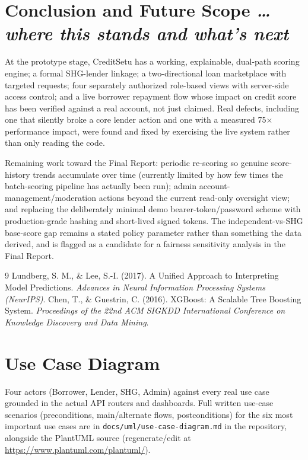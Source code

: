 \documentclass[11pt,a4paper]{article}
\newcommand{\BvrHint}[1]{%
  {\normalfont\normalsize\itshape\hfill #1}}
\begin{document}
\section{Conclusion and Future Scope%
\BvrHint{\ldots where this stands and what's next}}

At the prototype stage, CreditSetu has a working, explainable,
dual-path scoring engine; a formal SHG-lender linkage; a two-directional
loan marketplace with targeted requests; four separately authorized
role-based views with server-side access control; and a live borrower
repayment flow whose impact on credit score has been verified against
a real account, not just claimed. Real defects, including one that
silently broke a core lender action and one with a measured
75$\times$ performance impact, were found and fixed by exercising the
live system rather than only reading the code.

Remaining work toward the Final Report: periodic re-scoring so genuine
score-history trends accumulate over time (currently limited by how
few times the batch-scoring pipeline has actually been run); admin
account-management/moderation actions beyond the current read-only
oversight view; and replacing the deliberately minimal demo
bearer-token/password scheme with production-grade hashing and
short-lived signed tokens. The independent-vs-SHG base-score gap
remains a stated policy parameter rather than something the data
derived, and is flagged as a candidate for a fairness sensitivity
analysis in the Final Report.


\begin{thebibliography}{9}
Lundberg, S. M., \& Lee, S.-I. (2017). A Unified Approach to
Interpreting Model Predictions. \textit{Advances in Neural Information
Processing Systems (NeurIPS)}.
Chen, T., \& Guestrin, C. (2016). XGBoost: A Scalable Tree Boosting
System. \textit{Proceedings of the 22nd ACM SIGKDD International
Conference on Knowledge Discovery and Data Mining}.
\end{thebibliography}

\newpage
\appendix
\section{Use Case Diagram}
\label{sec:usecase-diagram}
Four actors (Borrower, Lender, SHG, Admin) against every real use case
grounded in the actual API routers and dashboards. Full written
use-case scenarios (preconditions, main/alternate flows,
postconditions) for the six most important use cases are in
\texttt{docs/uml/use-case-diagram.md} in the repository, alongside the
PlantUML source (regenerate/edit at
\url{https://www.plantuml.com/plantuml/}).
\end{document}
